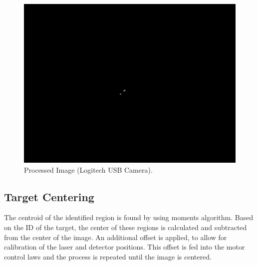 \documentclass[botnum, fleqn]{unmeethesis}
\begin{document}
\begin{figure}[htb]
 \begin{center}
  \includegraphics[width=0.36 \textwidth]{figures/hsvThreshAndMask.png}
  \caption{\small \label{fig:dot} Processed Image (Logitech USB Camera).}
 \end{center}
\end{figure}

\clearpage

\subsection*{Target Centering}
The centroid of the identified region is found by using moments algorithm. Based on the ID of the target, the center of these regions is calculated and subtracted from the center of the image. An additional offset is applied, to allow for calibration of the laser and detector positions. This offset is fed into the motor control laws and the process is repeated until the image is centered.
\end{document}

